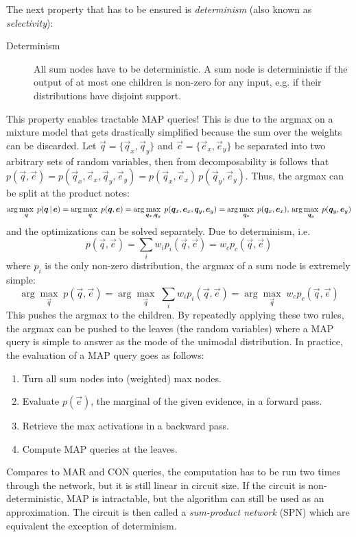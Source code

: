 			The next property that has to be ensured is \emph{determinism} (also known as \emph{selectivity}):
			\begin{description}
				\item[Determinism] All sum nodes have to be deterministic. A sum node is deterministic if the output of at most one children is non-zero for any input, e.g. if their distributions have disjoint support.
			\end{description}
			This property enables tractable MAP queries! This is due to the argmax on a mixture model that gets drastically simplified because the sum over the weights can be discarded. Let \( \vec{q} = \{ \vec{q}_x, \vec{q}_y \} \) and \( \vec{e} = \{ \vec{e}_x, \vec{e}_y \} \) be separated into two arbitrary sets of random variables, then from decomposability is follows that \( p(\vec{q}, \vec{e}) = p(\vec{q}_x, \vec{e}_x, \vec{q}_y, \vec{e}_y) = p(\vec{q}_x, \vec{e}_x) \, p(\vec{q}_y, \vec{e}_y) \). Thus, the argmax can be split at the product notes:
			\begin{equation}
				\arg\max_{\bm{q}} \; p(\bm{q} \,\vert\, \bm{e})
					= \arg\max_{\bm{q}} \; p(\bm{q}, \bm{e})
					= \arg\max_{\bm{q}_x, \bm{q}_y} \; p(\bm{q}_x, \bm{e}_x, \bm{q}_y, \bm{e}_y)
					= \arg\max_{\bm{q}_x} \; p(\bm{q}_x, \bm{e}_x),\, \arg\max_{\bm{q}_y} \; p(\bm{q}_y, \bm{e}_y)
			\end{equation}
			and the optimizations can be solved separately. Due to determinism, i.e.
			\begin{equation}
				p(\vec{q}, \vec{e}) = \sum_i w_i p_i(\vec{q}, \vec{e}) = w_c p_c(\vec{q}, \vec{e})
			\end{equation}
			where \(p_i\) is the only non-zero distribution, the argmax of a sum node is extremely simple:
			\begin{equation}
				\arg\max_{\vec{q}} \; p(\vec{q}, \vec{e})
					= \arg\max_{\vec{q}} \; \sum_i w_i p_i(\vec{q}, \vec{e})
					= \arg\max_{\vec{q}} \; w_c p_c(\vec{q}, \vec{e})
			\end{equation}
			This pushes the argmax to the children. By repeatedly applying these two rules, the argmax can be pushed to the leaves (the random variables) where a MAP query is simple to answer as the mode of the unimodal distribution. In practice, the evaluation of a MAP query goes as follows:
			\begin{enumerate}
				\item Turn all sum nodes into (weighted) max nodes.
				\item Evaluate \( p(\vec{e}) \), the marginal of the given evidence, in a forward pass.
				\item Retrieve the max activations in a backward pass.
				\item Compute MAP queries at the leaves.
			\end{enumerate}
			Compares to MAR and CON queries, the computation has to be run two times through the network, but it is still linear in circuit size. If the circuit is non-deterministic, MAP is intractable, but the algorithm can still be used as an approximation. The circuit is then called a \emph{sum-product network} (SPN) which are equivalent the exception of determinism.

